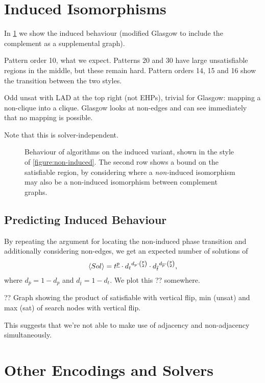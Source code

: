 \documentclass[letterpaper]{article}
\begin{document}
\section{Induced Isomorphisms}

In \cref{figure:induced} we show the induced behaviour (modified Glasgow to include the complement
as a supplemental graph).

Pattern order 10, what we expect. Patterns 20 and 30 have large unsatisfiable regions in the middle,
but these remain hard. Pattern orders 14, 15 and 16 show the transition between the two styles.

Odd unsat with LAD at the top right (not EHPs), trivial for Glasgow: mapping a non-clique into a
clique. Glasgow looks at non-edges and can see immediately that no mapping is possible.

Note that this is solver-independent.

\begin{figure*}[tb]
    
    \caption{Behaviour of algorithms on the induced variant, shown in the style
    of \cref{figure:non-induced}. The second row shows a bound on the satisfiable region, by
    considering where a \emph{non-}induced isomorphism may also be a non-induced isomorphism between
    complement graphs.}\label{figure:induced}
\end{figure*}

\subsection{Predicting Induced Behaviour}

By repeating the argument for locating the non-induced phase transition and additionally considering
non-edges, we get an expected number of solutions of \[ \langle Sol \rangle = t^{\underline{p}}
\cdot {d_t}^{d_p \cdot \binom{p}{2}} \cdot {d_{\overline{t}}}^{d_{\overline{p}} \cdot \binom{p}{2}}
\textnormal{,} \] where $d_{\overline{p}} = 1 - d_p$ and $d_{\overline{t}} = 1 - d_t$. We plot this
?? somewhere.

?? Graph showing the product of satisfiable with vertical flip, min (unsat) and max (sat) of search
nodes with vertical flip.

This suggests that we're not able to make use of adjacency and non-adjacency simultaneously.

\section{Other Encodings and Solvers}
\end{document}
